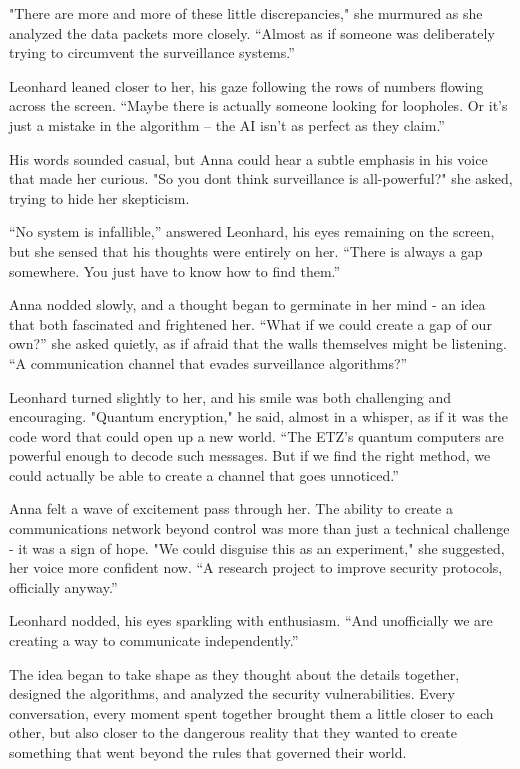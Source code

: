 \documentclass[
]{article}
\begin{document}
"There are more and more of these little discrepancies," she murmured as
she analyzed the data packets more closely. ``Almost as if someone was
deliberately trying to circumvent the surveillance systems.''

Leonhard leaned closer to her, his gaze following the rows of numbers
flowing across the screen. ``Maybe there is actually someone looking for
loopholes. Or it's just a mistake in the algorithm -- the AI
\hspace{0pt}\hspace{0pt}isn't as perfect as they claim.''

His words sounded casual, but Anna could hear a subtle emphasis in his
voice that made her curious. "So you don\textquotesingle t think
surveillance is all-powerful?" she asked, trying to hide her skepticism.

``No system is infallible,'' answered Leonhard, his eyes remaining on
the screen, but she sensed that his thoughts were entirely on her.
``There is always a gap somewhere. You just have to know how to find
them.''

Anna nodded slowly, and a thought began to germinate in her mind - an
idea that both fascinated and frightened her. ``What if we could create
a gap of our own?'' she asked quietly, as if afraid that the walls
themselves might be listening. ``A communication channel that evades
surveillance algorithms?''

Leonhard turned slightly to her, and his smile was both challenging and
encouraging. "Quantum encryption," he said, almost in a whisper, as if
it was the code word that could open up a new world. ``The ETZ's quantum
computers are powerful enough to decode such messages. But if we find
the right method, we could actually be able to create a channel that
goes unnoticed.''

Anna felt a wave of excitement pass through her. The ability to create a
communications network beyond control was more than just a technical
challenge - it was a sign of hope. "We could disguise this as an
experiment," she suggested, her voice more confident now. ``A research
project to improve security protocols, officially anyway.''

Leonhard nodded, his eyes sparkling with enthusiasm. ``And unofficially
we are creating a way to communicate independently.''

The idea began to take shape as they thought about the details together,
designed the algorithms, and analyzed the security vulnerabilities.
Every conversation, every moment spent together brought them a little
closer to each other, but also closer to the dangerous reality that they
wanted to create something that went beyond the rules that governed
their world.
\end{document}
